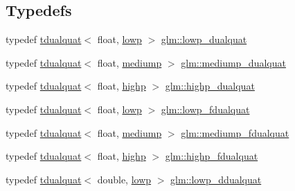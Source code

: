 \subsection*{Typedefs}
\begin{DoxyCompactItemize}
\item 
typedef \mbox{\hyperlink{structglm_1_1tdualquat}{tdualquat}}$<$ float, \mbox{\hyperlink{namespaceglm_a0f04f086094c747d227af4425893f545ae161af3fc695e696ce3bf69f7332bc2d}{lowp}} $>$ \mbox{\hyperlink{group__gtx__dual__quaternion_ga4888200ed911e4887c2423fed74ad362}{glm\+::lowp\+\_\+dualquat}}
\item 
typedef \mbox{\hyperlink{structglm_1_1tdualquat}{tdualquat}}$<$ float, \mbox{\hyperlink{namespaceglm_a0f04f086094c747d227af4425893f545a6416f3ea0c9025fb21ed50c4d6620482}{mediump}} $>$ \mbox{\hyperlink{group__gtx__dual__quaternion_gaa88fe93eb823d1aba8d6df8028572cb5}{glm\+::mediump\+\_\+dualquat}}
\item 
typedef \mbox{\hyperlink{structglm_1_1tdualquat}{tdualquat}}$<$ float, \mbox{\hyperlink{namespaceglm_a0f04f086094c747d227af4425893f545ac6f7eab42eacbb10d59a58e95e362074}{highp}} $>$ \mbox{\hyperlink{group__gtx__dual__quaternion_ga98557c3577757f2ced8f35b1de7fa234}{glm\+::highp\+\_\+dualquat}}
\item 
typedef \mbox{\hyperlink{structglm_1_1tdualquat}{tdualquat}}$<$ float, \mbox{\hyperlink{namespaceglm_a0f04f086094c747d227af4425893f545ae161af3fc695e696ce3bf69f7332bc2d}{lowp}} $>$ \mbox{\hyperlink{group__gtx__dual__quaternion_ga797f6d2679ab6773c1f057b97bf95111}{glm\+::lowp\+\_\+fdualquat}}
\item 
typedef \mbox{\hyperlink{structglm_1_1tdualquat}{tdualquat}}$<$ float, \mbox{\hyperlink{namespaceglm_a0f04f086094c747d227af4425893f545a6416f3ea0c9025fb21ed50c4d6620482}{mediump}} $>$ \mbox{\hyperlink{group__gtx__dual__quaternion_ga93e9def86ffeedd48d9c79a6afacfa6c}{glm\+::mediump\+\_\+fdualquat}}
\item 
typedef \mbox{\hyperlink{structglm_1_1tdualquat}{tdualquat}}$<$ float, \mbox{\hyperlink{namespaceglm_a0f04f086094c747d227af4425893f545ac6f7eab42eacbb10d59a58e95e362074}{highp}} $>$ \mbox{\hyperlink{group__gtx__dual__quaternion_ga8c46d61c38b2b6d9c5091c667dd20fe8}{glm\+::highp\+\_\+fdualquat}}
\item 
typedef \mbox{\hyperlink{structglm_1_1tdualquat}{tdualquat}}$<$ double, \mbox{\hyperlink{namespaceglm_a0f04f086094c747d227af4425893f545ae161af3fc695e696ce3bf69f7332bc2d}{lowp}} $>$ \mbox{\hyperlink{group__gtx__dual__quaternion_ga361a2ea6cce1446a8ab7e7803156c16c}{glm\+::lowp\+\_\+ddualquat}}

\end{DoxyCompactItemize}
